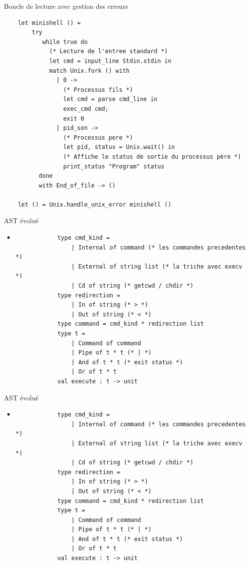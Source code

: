 \begin{frame}[fragile]{Boucle de lecture avec gestion des erreurs}
\begin{lstlisting}
    let minishell () =
        try
           while true do
             (* Lecture de l'entree standard *)
             let cmd = input_line Stdin.stdin in
             match Unix.fork () with
               | 0 ->
                 (* Processus fils *)
                 let cmd = parse cmd_line in
                 exec_cmd cmd;
                 exit 0
               | pid_son ->
                 (* Processus pere *)
                 let pid, status = Unix.wait() in
                 (* Affiche le status de sortie du processus père *)
                 print_status "Program" status
          done
          with End_of_file -> ()

    let () = Unix.handle_unix_error minishell ()
\end{lstlisting}
\end{frame}

\begin{frame}[fragile]{AST évolué}
    \begin{itemize}[leftmargin=-10pt]
         \item
        \begin{lstlisting}
            type cmd_kind =
                | Internal of command (* les commandes precedentes *)
                | External of string list (* la triche avec execv *)
                | Cd of string (* getcwd / chdir *)
            type redirection =
                | In of string (* > *)
                | Out of string (* < *)
            type command = cmd_kind * redirection list
            type t =
                | Command of command
                | Pipe of t * t (* | *)
                | And of t * t (* exit status *)
                | Or of t * t
            val execute : t -> unit
        \end{lstlisting}
    \end{itemize}

\end{frame}


\begin{frame}[fragile]{AST évolué}
    \begin{itemize}[leftmargin=-10pt]
         \item
        \begin{lstlisting}
            type cmd_kind =
                | Internal of command (* les commandes precedentes *)
                | External of string list (* la triche avec execv *)
                | Cd of string (* getcwd / chdir *)
            type redirection =
                | In of string (* > *)
                | Out of string (* < *)
            type command = cmd_kind * redirection list
            type t =
                | Command of command
                | Pipe of t * t (* | *)
                | And of t * t (* exit status *)
                | Or of t * t
            val execute : t -> unit
        \end{lstlisting}
    \end{itemize}

\end{frame}

